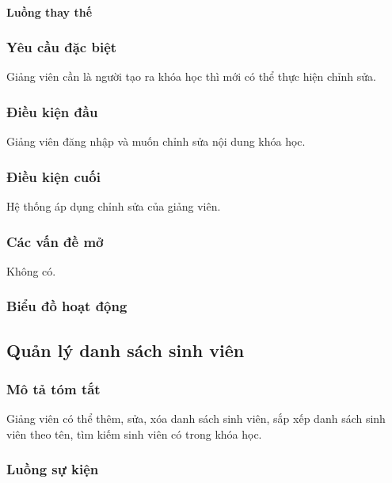 \documentclass[./../main_file.tex]{subfiles}
\begin{document}
\paragraph{Luồng thay thế}
\subsubsection{Yêu cầu đặc biệt}
Giảng viên cần là người tạo ra khóa học thì mới có thể thực hiện chỉnh sửa.

\subsubsection{Điều kiện đầu}
Giảng viên đăng nhập và muốn chỉnh sửa nội dung khóa học.

\subsubsection{Điều kiện cuối}
Hệ thống áp dụng chỉnh sửa của giảng viên.

\subsubsection{Các vấn đề mở}
Không có.

\subsubsection{Biểu đồ hoạt động}


\subsection{Quản lý danh sách sinh viên}
\subsubsection{Mô tả tóm tắt}
Giảng viên có thể thêm, sửa, xóa danh sách sinh viên, sắp xếp danh sách sinh viên theo tên, tìm kiếm sinh viên có trong khóa học.

\subsubsection{Luồng sự kiện}
\end{document}

